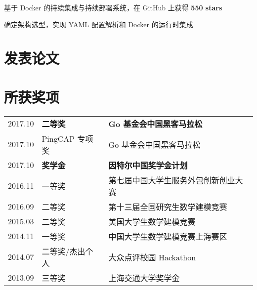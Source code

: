\documentclass[]{deedy-resume-openfont}
\begin{document}
\hfill
\begin{minipage}[t]{0.68\textwidth}



\begin{tightemize}
    \item 基于 Docker 的持续集成与持续部署系统，在 GitHub 上获得 \textbf{550 stars}
    \item 确定架构选型，实现 YAML 配置解析和 Docker 的运行时集成
    \end{tightemize}
\sectionsep



\section{发表论文}
\sectionsep
\sectionsep


\nocite{*}
\sectionsep

\section{所获奖项}
\sectionsep
\begin{tabular}{rll}
2017.10     & \textbf{二等奖}  & \textbf{Go 基金会中国黑客马拉松} \\
2017.10     & PingCAP 专项奖 & Go 基金会中国黑客马拉松 \\
2017.10     & \textbf{奖学金}  & \textbf{因特尔中国奖学金计划} \\
2016.11	    & 一等奖  & 第七届中国大学生服务外包创新创业大赛 \\
2016.09	    & 二等奖  & 第十三届全国研究生数学建模竞赛 \\
2015.03	    & 二等奖  & 美国大学生数学建模竞赛 \\
2014.11     & 一等奖 & 中国大学生数学建模竞赛上海赛区 \\
2014.07	    & 二等奖/杰出个人  & 大众点评校园 Hackathon \\
2013.09     & 三等奖 & 上海交通大学奖学金 \\
\end{tabular}
\sectionsep


\end{minipage}
\end{document}

